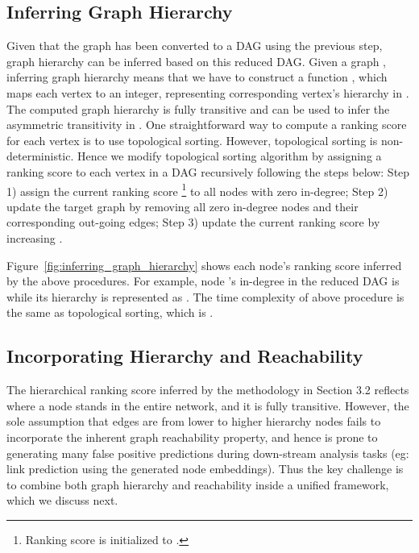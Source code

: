 \documentclass[letterpaper]{article} \usepackage{aaai19}  \usepackage{times}  \usepackage{helvet}  \usepackage{courier}  \usepackage{url}  \usepackage{graphicx}  \usepackage{booktabs} \usepackage{xcolor}
\begin{document}
\subsection{Inferring Graph Hierarchy}
\label{sec:inferring_graph_hierarchy}

Given that the graph has been converted to a DAG using the previous step, graph hierarchy can be inferred based on this reduced DAG. Given a graph , inferring graph hierarchy means that we have to construct a function , which maps each vertex to an integer, representing corresponding vertex's hierarchy in . The computed graph hierarchy is fully transitive and can be used to infer the asymmetric transitivity in .
One straightforward way to compute a ranking score for each vertex is to use topological sorting. However, topological sorting is non-deterministic. Hence we modify topological sorting algorithm by assigning a ranking score to each vertex in a DAG recursively following the steps below: Step 1) assign the current ranking score  \footnote{Ranking score  is initialized to .} to all nodes with zero in-degree; Step 2) update the target graph by removing all zero in-degree nodes and their corresponding out-going edges; Step 3) update the current ranking score  by increasing .



Figure~\ref{fig:inferring_graph_hierarchy} shows each node's ranking score inferred by the above procedures. For example, node 's in-degree in the reduced DAG is  while its hierarchy is represented as . The time complexity of above procedure is the same as topological sorting, which is .




















\subsection{Incorporating Hierarchy and Reachability}
\label{sec:build_matrix}

The hierarchical ranking score inferred by the methodology in Section 3.2 reflects where a node stands in the entire network, and it is fully transitive. However, the sole assumption that edges are from lower to higher hierarchy nodes fails to incorporate the inherent graph reachability property, and hence is prone to generating many false positive predictions during down-stream analysis tasks (eg: link prediction using the generated node embeddings).
Thus the key challenge is to combine both graph hierarchy and reachability inside a unified framework, which we discuss next.
\end{document}
